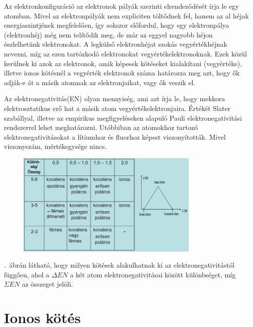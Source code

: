 \documentclass[colorlinks]{thesis-ekf}
\theoremstyle{definition}
\theoremstyle{remark}
\begin{document}
Az elektronkonfiguráció az elektronok pályák szerinti elrendeződését írja le egy atomban.\cite{periodusos_ppt} Mivel az elektronpályák nem expliciten töltődnek fel, hanem az al héjak energiaszintjének megfelelően, így sokszor előfordul, hogy egy elektronpálya (elektronhéj) még nem telítődik meg, de már az eggyel nagyobb héjon észlelhetünk elektronokat.
A legkülső elektronhéjat szokás vegyértékhéjnak nevezni, míg az ezen tartózkodó elektronokat vegyértékelektronoknak.\cite{vegyérték_sulinet} Ezek közül kerülnek ki azok az elektronok, amik képesek kötéseket kialakítani (vegyértéke), illetve ionos kötésnél a vegyérték elektronok száma határozza meg azt, hogy ők adják-e át a másik atomnak az elektronjaikat, vagy ők veszik el.\cite{ionos_vidi}

Az elektronegativitás(EN) olyan mennyiség, ami azt írja le, hogy mekkora elektrosztatikus erő hat a másik atom vegyértékelektronjaira.\cite{angol_en} Értékét Slater szabállyal, illetve az empirikus megfigyeléseken alapuló Pauli elektronegativitási rendszerrel lehet meghatározni. Utóbbiban az atomokhoz tartozó elektronegativitásokat a lítiumhoz és fluorhoz képest viszonyították. Mivel viszonyszám, mértékegysége nincs.\cite{miskolc_kemia}\cite{eke_kemia_ppt}

\begin{figure}[!ht]
	\centering
	\includegraphics[width=9cm]{en_slide}
	\caption{\cite[52.~ppt]{periodusos_ppt}}\label{EN_tablazat}
\end{figure}
.~ábrán látható, hogy milyen kötések alakulhatnak ki az elektronegativitástól függően, ahol a \begin{math}\Delta EN\end{math} a két atom elektronegativitásai között különbséget, míg \begin{math}\Sigma EN\end{math} az összeget jelöli.\cite{eke_kemia_ppt}
\section{Ionos kötés}
\end{document}
